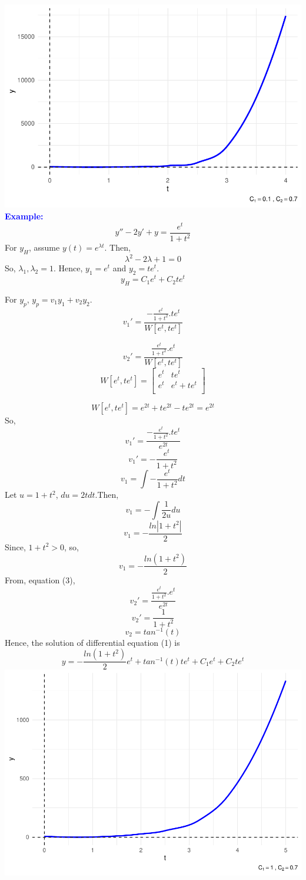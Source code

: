 \documentclass[
  11pt,
]{article}
\begin{document}
\includegraphics{differential_files/figure-latex/difference8-1.pdf}
\newpage \textbf{\textcolor{blue}{Example:}} \[
y''-2y'+y=\frac{e^t}{1+t^2} \tag{1}
\] For \(y_H\), assume \(y(t)=e^{\lambda t}\). Then, \[
\lambda ^2-2 \lambda + 1 = 0
\] So, \(\lambda _1, \lambda _2=1\). Hence, \(y_1=e^t\) and
\(y_2=te^t\). \[
y_H=C_1e^t+C_2te^t \tag{2}
\]

For \(y_p\), \(y_p = v_1y_1+v_2y_2\). \[
v_1'=\frac{-\frac{e^t}{1+t^2}.te^t}{W[e^t,te^t]} \tag{3}
\]

\[
v_2'=\frac{\frac{e^t}{1+t^2}.e^t}{W[e^t,te^t]} \tag{4}
\] \[
    W[e^t,te^t]
=
\begin{bmatrix}
   e^t & te^t \\
   e^t & e^t+te^t \\
\end{bmatrix}
\]

\[
W[e^t, te^t]=e^{2t}+te^{2t}-te^{2t} =e^{2t}
\] So, \[
v_1'=\frac{-\frac{e^t}{1+t^2}.te^t}{e^{2t}}
\] \[
v_1'=-\frac{e^t}{1+t^2}
\] \[
v_1=\int-\frac{e^t}{1+t^2}dt
\] Let \(u=1+t^2\), \(du=2tdt\).Then, \[
v_1=-\int\frac{1}{2u}du
\] \[
v_1=-\frac{ln|1+t^2|}{2}
\] Since, \(1+t^2 >0\), so, \[
v_1=-\frac{ln(1+t^2)}{2} \tag{5}
\] From, equation (3), \[
v_2'=\frac{\frac{e^t}{1+t^2}.e^t}{e^{2t}}
\] \[
v_2'=\frac{1}{1+t^2}
\] \[
v_2=tan^{-1}(t) \tag{6}
\] Hence, the solution of differential equation (1) is \[
y=-\frac{ln(1+t^2)}{2}e^t+tan^{-1}(t)te^t+C_1e^t+C_2te^t \tag{7}
\] \includegraphics{differential_files/figure-latex/difference9-1.pdf}
\end{document}
